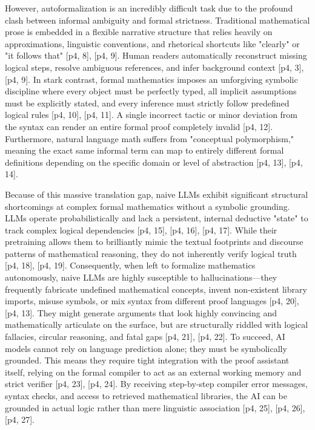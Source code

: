 However, autoformalization is an incredibly difficult task due to the profound clash between informal ambiguity and formal strictness. Traditional mathematical prose is embedded in a flexible narrative structure that relies heavily on approximations, linguistic conventions, and rhetorical shortcuts like "clearly" or "it follows that" [p4, 8], [p4, 9]. Human readers automatically reconstruct missing logical steps, resolve ambiguous references, and infer background context [p4, 3], [p4, 9]. In stark contrast, formal mathematics imposes an unforgiving symbolic discipline where every object must be perfectly typed, all implicit assumptions must be explicitly stated, and every inference must strictly follow predefined logical rules [p4, 10], [p4, 11]. A single incorrect tactic or minor deviation from the syntax can render an entire formal proof completely invalid [p4, 12]. Furthermore, natural language math suffers from "conceptual polymorphism," meaning the exact same informal term can map to entirely different formal definitions depending on the specific domain or level of abstraction [p4, 13], [p4, 14].

Because of this massive translation gap, naive LLMs exhibit significant structural shortcomings at complex formal mathematics without a symbolic grounding. LLMs operate probabilistically and lack a persistent, internal deductive "state" to track complex logical dependencies [p4, 15], [p4, 16], [p4, 17]. While their pretraining allows them to brilliantly mimic the textual footprints and discourse patterns of mathematical reasoning, they do not inherently verify logical truth [p4, 18], [p4, 19]. Consequently, when left to formalize mathematics autonomously, naive LLMs are highly susceptible to hallucinations—they frequently fabricate undefined mathematical concepts, invent non-existent library imports, misuse symbols, or mix syntax from different proof languages [p4, 20], [p4, 13]. They might generate arguments that look highly convincing and mathematically articulate on the surface, but are structurally riddled with logical fallacies, circular reasoning, and fatal gaps [p4, 21], [p4, 22]. To succeed, AI models cannot rely on language prediction alone; they must be symbolically grounded. This means they require tight integration with the proof assistant itself, relying on the formal compiler to act as an external working memory and strict verifier [p4, 23], [p4, 24]. By receiving step-by-step compiler error messages, syntax checks, and access to retrieved mathematical libraries, the AI can be grounded in actual logic rather than mere linguistic association [p4, 25], [p4, 26], [p4, 27].

